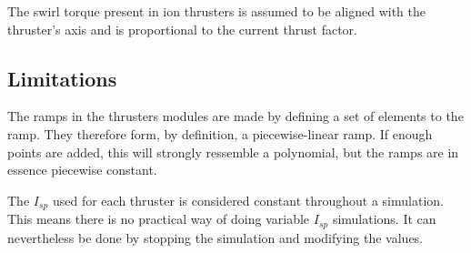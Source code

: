 The swirl torque present in ion thrusters is assumed to be aligned with the thruster's axis and is proportional to the current thrust factor.

\subsection{Limitations}

The ramps in the thrusters modules are made by defining a set of elements to the ramp. They therefore form, by definition, a piecewise-linear ramp. If enough points are added, this will strongly ressemble a polynomial, but the ramps are in essence piecewise constant.

The $I_{sp}$ used for each thruster is considered constant throughout a simulation. This means there is no practical way of doing variable $I_{sp}$ simulations. It can nevertheless be done by stopping the simulation and modifying the values.
